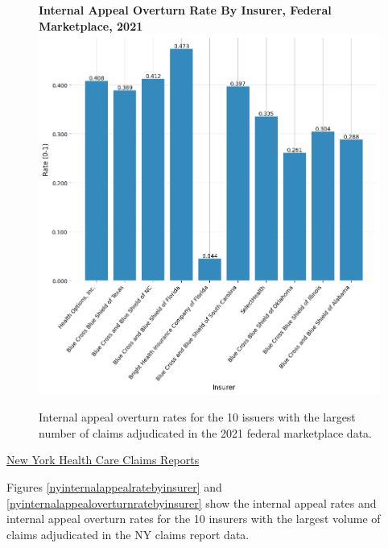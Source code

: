 \documentclass[12pt, a4paper,twoside]{report}
\theoremstyle{plain} %
\theoremstyle{definition} %
\theoremstyle{remark} %
\numberwithin{equation}{chapter}
\begin{document}
	
		\begin{figure}[h!]
			\centering
			\textbf{Internal Appeal Overturn Rate By Insurer, Federal Marketplace, 2021}
			\includegraphics[width=.8\columnwidth]{images/cms_puf/internal_appeal_overturn_rate_by_insurer.png}
			\caption{Internal appeal overturn rates for the 10 issuers with the largest number of claims adjudicated in the 2021 federal marketplace data.}
			\label{federalinternalappealoverturnratebyinsurer}
		\end{figure}
	
		\clearpage
		
		\underline{New York Health Care Claims Reports}
		
		Figures \ref{nyinternalappealratebyinsurer} and \ref{nyinternalappealoverturnratebyinsurer} show the internal appeal rates and internal appeal overturn rates for the 10 insurers with the largest volume of claims adjudicated in the NY claims report data.
		
\end{document}
